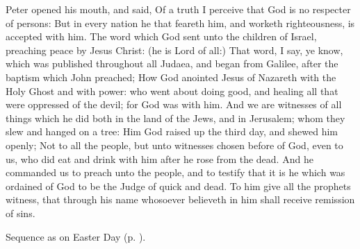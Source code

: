  Peter opened his mouth, and said, Of a truth I perceive that God is no respecter of persons: But in every nation he that feareth him, and worketh righteousness, is accepted with him. The word which God sent unto the children of Israel, preaching peace by Jesus Christ: (he is Lord of all:) That word, I say, ye know, which was published throughout all Judaea, and began from Galilee, after the baptism which John preached; How God anointed Jesus of Nazareth with the Holy Ghost and with power: who went about doing good, and healing all that were oppressed of the devil; for God was with him. And we are witnesses of all things which he did both in the land of the Jews, and in Jerusalem; whom they slew and hanged on a tree: Him God raised up the third day, and shewed him openly; Not to all the people, but unto witnesses chosen before of God, even to us, who did eat and drink with him after he rose from the dead. And he commanded us to preach unto the people, and to testify that it is he which was ordained of God to be the Judge of quick and dead. To him give all the prophets witness, that through his name whosoever believeth in him shall receive remission of sins.

\begin{rubric}
    Sequence as on Easter Day (p. \pageref{PaschalSequence}).
\end{rubric}

